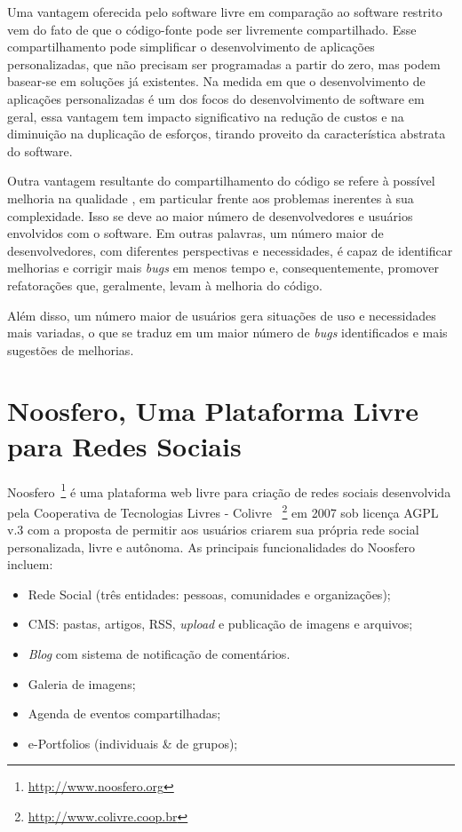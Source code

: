 
Uma vantagem oferecida pelo software livre em comparação ao software
restrito vem do fato de que o código-fonte pode ser livremente compartilhado.
%
Esse compartilhamento pode simplificar o desenvolvimento de aplicações
personalizadas, que não precisam ser programadas a partir do zero, mas
podem basear-se em soluções já existentes.
%
Na medida em que o desenvolvimento de aplicações personalizadas é um dos focos do
desenvolvimento de software em geral, essa vantagem tem impacto significativo na
redução de custos e na diminuição na duplicação de esforços, tirando proveito da
característica abstrata do software.

Outra vantagem resultante do compartilhamento do código se refere
à possível melhoria na qualidade \cite{CatedralBazzar}, em particular frente aos
problemas inerentes à sua complexidade.
%
Isso se deve ao maior número de desenvolvedores e usuários envolvidos
com o software. Em outras palavras, um número maior de desenvolvedores, com diferentes
perspectivas e necessidades, é capaz de identificar melhorias e corrigir
mais \emph{bugs} em menos tempo e, consequentemente, promover refatorações que,
geralmente, levam à melhoria do código.

%
Além disso, um número maior de usuários gera situações de uso e
necessidades mais variadas, o que se traduz em um maior número
de \emph{bugs} identificados e mais sugestões de melhorias.


\section{Noosfero, Uma Plataforma Livre para Redes Sociais}
\label{noosfero-section}

Noosfero~\footnote{\url{http://www.noosfero.org}}
é uma  plataforma web livre para criação de redes sociais desenvolvida
pela Cooperativa de Tecnologias Livres - Colivre
~\footnote{\url{http://www.colivre.coop.br}} 
em 2007 sob licença AGPL v.3 com a proposta de permitir aos usuários criarem sua
própria rede social personalizada, livre e autônoma.
%
As principais funcionalidades do Noosfero incluem:

\begin{itemize}

\item Rede Social (três entidades: pessoas, comunidades e organizações);
\item CMS: pastas, artigos, RSS, \textit{upload} e publicação de imagens e
arquivos;
\item \textit{Blog} com sistema de notificação de comentários.
\item Galeria de imagens;
\item Agenda de eventos compartilhadas;
\item e-Portfolios (individuais \& de grupos);

\end{itemize}

